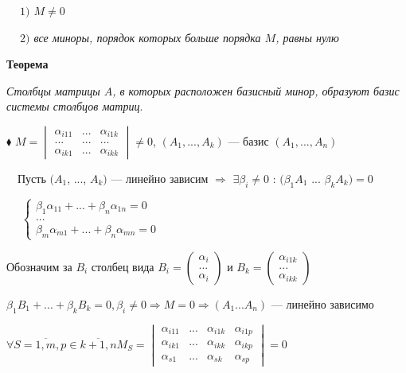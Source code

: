 \documentclass[a4paper, 12pt]{report}
\begin{document}
	$\quad \ $\textit{$1)$ $M \ne 0$ }
	
	$\quad \ $\textit{$2)$ все миноры, порядок которых больше порядка $M$, равны нулю }
	\par\bigskip
	\textbf{Теорема}
	
	\textit{Столбцы матрицы $A$, в которых расположен базисный минор, образуют базис системы столбцов матриц}.
	\par\bigskip
	$\blacklozenge$ $M=\begin{vmatrix}
		\alpha_{i11} & ... & \alpha_{i1k}
		\\ ... & ... & ...
		\\ \alpha_{ik1} & ... & \alpha_{ikk}
	\end{vmatrix} \ne 0$, $(A_{1}, ..., A_{k})$ --- базис $(A_{1}, ..., A_{n})$
	\par\bigskip
	$\quad $Пусть $(A_{1}$, ..., $A_{k})$ --- линейно зависим $\Rightarrow$ $\exists \beta_{i} \ne 0$ : $(\beta_{1}A_{1}$ ... $\beta_{k}A_{k}) = 0$
	\par\bigskip
	$\quad$ $\begin{cases}
		\beta_{1}\alpha_{11} + ... + \beta_{n}\alpha_{1n} = 0
		\\ ...
		\\ \beta_{m}\alpha_{m1} + ... + \beta_{n}\alpha_{mn} = 0
	\end{cases}$
	
	\quad Обозначим за $B_{i}$ столбец вида  $B_{i} = \begin{pmatrix} \alpha_{i}
		\\ ...
		\\ \alpha_{i}
	\end{pmatrix}$ и $B_{k} = \begin{pmatrix} \alpha_{i1k}
		\\ ...
		\\ \alpha_{ikk}
	\end{pmatrix}$
	
	\quad $\beta_{1}B_{1} + ... + \beta_{k}B_{k} = 0, \beta_{i} \ne 0 \Rightarrow M = 0 \Rightarrow (A_{1} ... A_{n})$ --- линейно зависимо
	
	\quad $\forall S = \overline{1, m}, p \in \overline{k+1, n} M_{S} = \begin{vmatrix} \alpha_{i11} & ... & \alpha_{i1k} & \alpha_{i1p}
		\\ \alpha_{ik1} & ... & \alpha_{ikk} & \alpha_{ikp}
		\\ \alpha_{s1} & ... & \alpha_{sk} & \alpha_{sp}
	\end{vmatrix} = 0$
	
\end{document}
